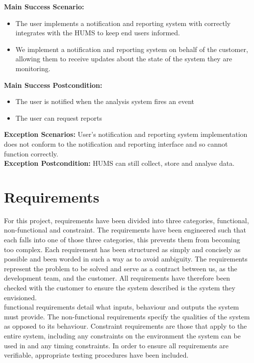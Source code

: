 \documentclass[10pt,a4paper]{article}
\begin{document}
\textbf{Main Success Scenario:}
\begin{itemize}
\item The user implements a notification and reporting system with correctly
integrates with the HUMS to keep end users informed.
\item We implement a notification and reporting system on behalf of the
customer, allowing them to receive updates about the state of the system they
are monitoring.
\end{itemize}
\textbf{Main Success Postcondition:}
\begin{itemize}
\item The user is notified when the analysis system fires an event
\item The user can request reports
\end{itemize}
\textbf{Exception Scenarios:} User's notification and reporting system
implementation does not conform to the notification and reporting interface and
so cannot function correctly.\\
\textbf{Exception Postcondition:} HUMS can still collect, store and analyse
data.

\section{Requirements}
For this project, requirements have been divided into three categories,
functional, non-functional and constraint. The requirements have been
engineered such that each falls into one of those three categories, this
prevents them from becoming too complex. Each requirement has been
structured as simply and concisely as possible and been worded in such a way
as to avoid ambiguity. The requirements represent the problem to be solved
and serve as a contract between us, as the development team, and the
customer. All requirements have therefore been checked with the customer to
ensure the system described is the system they envisioned.\\
functional requirements detail what inputs, behaviour and outputs the system
must provide. The non-functional requirements specify the qualities of the
system as opposed to its behaviour. Constraint requirements are those that apply
to the entire system, including any constraints on the environment the system
can be used in and any timing constraints. In order to ensure all requirements
are verifiable, appropriate testing procedures have been included.


\end{document}
